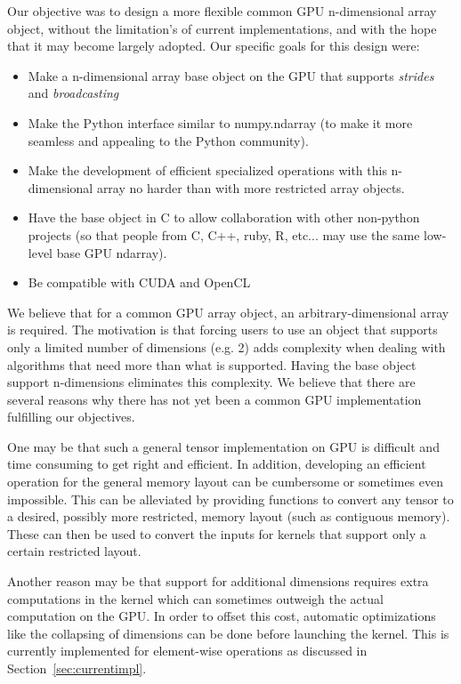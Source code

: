 \documentclass{article} %
\begin{document}
Our objective was to design a more flexible common GPU n-dimensional array object, 
without the limitation's of current implementations, and with the hope that it may become largely adopted. 
Our specific goals for this design were:

\begin{itemize}
\item Make a n-dimensional array base object on the GPU that supports \emph{strides} and \emph{broadcasting}
\item Make the Python interface similar to numpy.ndarray (to make it more seamless and appealing to the Python community).
\item Make the development of efficient specialized operations with this n-dimensional array no harder than with more restricted array objects. 
\item Have the base object in C to allow collaboration with other non-python projects (so that people from C, C++, ruby, R, etc... may use the same low-level base GPU ndarray).
\item Be compatible with CUDA and OpenCL
\end{itemize}

We believe that for a common GPU array object, an arbitrary-dimensional array is required.
The motivation is that forcing users to use an object that supports only a limited number of dimensions (e.g. 2) 
adds complexity when dealing with algorithms that need more than what is supported. %
Having the base object support n-dimensions eliminates this complexity.
We believe that there are several reasons why there has not yet been a common GPU implementation fulfilling our objectives.

One may be that such a general tensor implementation on GPU is difficult and time consuming to get right and efficient.
In addition, developing an efficient operation for the general memory layout can be cumbersome or sometimes even impossible.
This can be alleviated by providing functions to convert any tensor to a desired, possibly more restricted, memory layout (such as contiguous memory).
These can then be used to convert the inputs for kernels that support only a certain restricted layout.

Another reason may be that support for additional dimensions requires extra computations in the kernel which can sometimes outweigh the actual computation on the GPU.
In order to offset this cost, automatic optimizations like the collapsing of dimensions can be done before launching the kernel.  
This is currently implemented for element-wise operations as discussed in Section~\ref{sec:currentimpl}.
\end{document}
